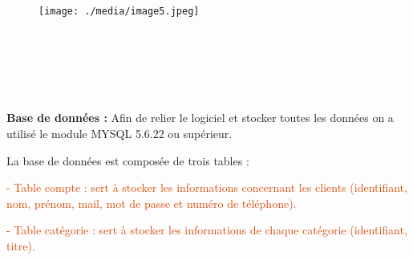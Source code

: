\documentclass[12pt]{report}
\begin{document}

\begin{figure}[H]
	\begin{Center}
		\texttt{[image: ./media/image5.jpeg]}
	\end{Center}
\end{figure}



\begin{justify}
\textcolor[HTML]{D44501}{\ \ \ \ \ \ \ \ \ \ \ \ \ \ \ \ \ \ \ \ \ \ \ \  }
\end{justify}\par

\begin{justify}
\textcolor[HTML]{D44501}{\ \ \ \ \ \ \ \ \ \ \ \ \ \ \ \ \ \ \ \ \ \ \ \ \ \ \ \ \ \ \ \ \ \ \ \ \ \ \ \  }
\end{justify}\par

\begin{justify}
\textcolor[HTML]{D44501}{\ \ \ \ \ \ \ \ \ \ \ \ \ \ \ \ \ \ \ \ \ \ \ \  }
\end{justify}\par


\vspace{\baselineskip}

\vspace{\baselineskip}
\begin{justify}
\textbf{Base de données :} Afin de relier le logiciel et stocker toutes les données on a utilisé le module MYSQL 5.6.22 ou supérieur.
\end{justify}\par

\begin{justify}
La base de données est composée de trois tables\textit{ }:
\end{justify}\par

\begin{justify}
\textcolor[HTML]{D44501}{- Table compte : sert à stocker les informations concernant les clients (identifiant, nom, prénom, mail, mot de passe et numéro de téléphone).}
\end{justify}\par

\begin{justify}
\textcolor[HTML]{D44501}{- Table catégorie : sert à stocker les informations de chaque catégorie (identifiant, titre).}
\end{justify}\par
\end{document}
